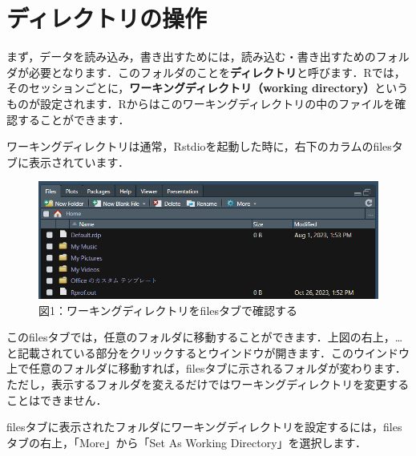 \documentclass[
  letterpaper,
  DIV=11,
  numbers=noendperiod]{scrreprt}
\begin{document}
\hypertarget{ux30c7ux30a3ux30ecux30afux30c8ux30eaux306eux64cdux4f5c}{%
\section{ディレクトリの操作}\label{ux30c7ux30a3ux30ecux30afux30c8ux30eaux306eux64cdux4f5c}}

まず，データを読み込み，書き出すためには，読み込む・書き出すためのフォルダが必要となります．このフォルダのことを\textbf{ディレクトリ}と呼びます．Rでは，そのセッションごとに，\textbf{ワーキングディレクトリ（working
directory）}というものが設定されます．Rからはこのワーキングディレクトリの中のファイルを確認することができます．

ワーキングディレクトリは通常，Rstdioを起動した時に，右下のカラムのfilesタブに表示されています．

\begin{figure}

{\centering \includegraphics{././image/filestab.png}

}

\caption{図1：ワーキングディレクトリをfilesタブで確認する}

\end{figure}

このfilesタブでは，任意のフォルダに移動することができます．上図の右上，\ldots と記載されている部分をクリックするとウインドウが開きます．このウインドウ上で任意のフォルダに移動すれば，filesタブに示されるフォルダが変わります．ただし，表示するフォルダを変えるだけではワーキングディレクトリを変更することはできません．

filesタブに表示されたフォルダにワーキングディレクトリを設定するには，filesタブの右上，「More」から「Set
As Working Directory」を選択します．
\end{document}
